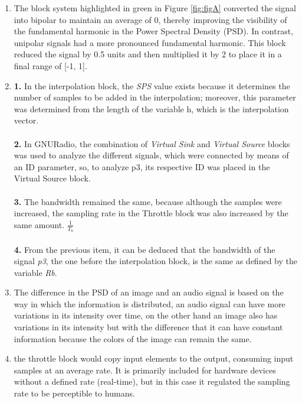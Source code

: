 \documentclass{journal}[IEEEtran, twocolumn]             %
\begin{document}
\begin{multicols}{2}
\renewcommand{\labelenumi}{{\Alph{enumi}})}
\begin{enumerate}
    \item The block system highlighted in green in Figure \ref{fig:figA} converted the signal into bipolar to maintain an average of 0, thereby improving the visibility of the fundamental harmonic in the Power Spectral Density (PSD). In contrast, unipolar signals had a more pronounced fundamental harmonic. This block reduced the signal by 0.5 units and then multiplied it by 2 to place it in a final range of [-1, 1].

    \item \textbf{1.} In the interpolation block, the \textit{SPS} value exists because it determines the number of samples to be added in the interpolation; moreover, this parameter was determined from the length of the variable h, which is the interpolation vector.\\
    \\
    \textbf{2.} In GNURadio, the combination of \textit{Virtual Sink} and \textit{Virtual Source} blocks was used to analyze the different signals, which were connected by means of an ID parameter, so, to analyze p3, its respective ID was placed in the Virtual Source block.\\
    \\
    \textbf{3.} The bandwidth remained the same, because although the samples were increased, the sampling rate in the Throttle block was also increased by the same amount. $\frac{1}{T_b}$\\
    \\
    \textbf{4.} From the previous item, it can be deduced that the bandwidth of the signal \textit{p3}, the one before the interpolation block, is the same as defined by the variable \textit{Rb}.\\

    \item The difference in the PSD of an image and an audio signal is based on the way in which the information is distributed, an audio signal can have more variations in its intensity over time, on the other hand an image also has variations in its intensity but with the difference that it can have constant information because the colors of the image can remain the same.

    \item the throttle block would copy input elements to the output, consuming input samples at an average rate. It is primarily included for hardware devices without a defined rate (real-time), but in this case it regulated the sampling rate to be perceptible to humans.


\end{enumerate}
\end{multicols}
\end{document}
